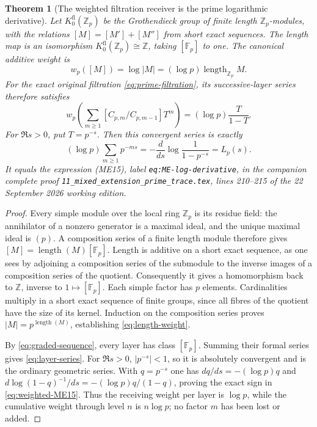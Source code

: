 \documentclass[11pt,a4paper]{article}
\newtheorem{theorem}{Theorem}[section]
\theoremstyle{definition}\newtheorem{definition}[theorem]{Definition}
\providecommand{\length}{\operatorname{length}}
\begin{document}
\begin{theorem}[The weighted filtration receiver is the prime logarithmic derivative]
\label{thm:weighted-filtration}
Let $K_0^{\mathrm{fl}}(\mathbb Z_p)$ be the Grothendieck group of finite
length $\mathbb Z_p$-modules, with the relations
$[M]=[M']+[M'']$ from short exact sequences. The length map is an
isomorphism $K_0^{\mathrm{fl}}(\mathbb Z_p)\cong\mathbb Z$, taking
$[\mathbb F_p]$ to one. The canonical additive weight is
\[
 w_p([M])=\log|M|=(\log p)\length_{\mathbb Z_p}M.
 \tag{RP33}\label{eq:length-weight}
\]
For the exact original filtration \eqref{eq:prime-filtration}, its
successive-layer series therefore satisfies
\[
 w_p\left(\sum_{m\ge1}[C_{p,m}/C_{p,m-1}]T^m\right)
   =(\log p)\frac{T}{1-T}.
 \tag{RP34}\label{eq:layer-series}
\]
For $\Re s>0$, put $T=p^{-s}$. Then this convergent series is exactly
\[
 (\log p)\sum_{m\ge1}p^{-ms}
 =-\frac{d}{ds}\log\frac1{1-p^{-s}}=L_p(s).
 \tag{RP35}\label{eq:weighted-ME15}
\]
It equals the expression (ME15), label
\texttt{eq:ME-log-derivative}, in the companion complete proof
\texttt{11\_mixed\_extension\_prime\_trace.tex}, lines 210--215 of
the 22 September 2026 working edition.
\end{theorem}
\begin{proof}
Every simple module over the local ring $\mathbb Z_p$ is its residue
field: the annihilator of a nonzero generator is a maximal ideal,
and the unique maximal ideal is $(p)$. A composition series of a
finite length module therefore gives $[M]=\length(M)[\mathbb F_p]$.
Length is additive on a short exact sequence, as one sees by adjoining
a composition series of the submodule to the inverse images of a
composition series of the quotient. Consequently it gives a homomorphism
back to $\mathbb Z$, inverse to $1\mapsto[\mathbb F_p]$.
Each simple factor has $p$ elements. Cardinalities multiply in a short
exact sequence of finite groups, since all fibres of the quotient
have the size of its kernel. Induction on the composition series
proves $|M|=p^{\length(M)}$, establishing \eqref{eq:length-weight}.

By \eqref{eq:graded-sequence}, every layer has class $[\mathbb F_p]$.
Summing their formal series gives \eqref{eq:layer-series}. For
$\Re s>0$, $|p^{-s}|<1$, so it is absolutely convergent and is the
ordinary geometric series. With $q=p^{-s}$ one has
$dq/ds=-(\log p)q$ and
$d\log(1-q)^{-1}/ds=-(\log p)q/(1-q)$, proving the exact sign in
\eqref{eq:weighted-ME15}. Thus the receiving weight per layer is
$\log p$, while the cumulative weight through level $n$ is
$n\log p$; no factor $m$ has been lost or added.
\end{proof}
\end{document}
